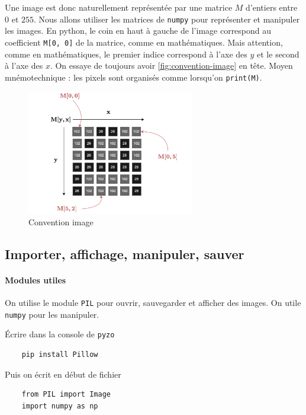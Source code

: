 Une image est donc naturellement représentée par une matrice $ M $ d'entiers entre $ 0 $ et $ 255 $. Nous allons utiliser les matrices de \texttt{numpy} pour représenter et manipuler les images. En python, le coin en haut à gauche de l'image correspond au coefficient \texttt{M[0, 0]} de la matrice, comme en mathématiques. Mais attention, comme en mathématiques, le premier indice correspond à l'axe des $ y $ et le second à l'axe des $ x $. On essaye de toujours avoir \autoref{fig:convention-image} en tête. Moyen mnémotechnique : les pixels sont organisés comme lorsqu'on \texttt{print(M)}.

\begin{figure}[h!]
    \begin{center}
        \includegraphics[width=0.65\textwidth]{figures/image_grise.png}
    \end{center}
    \caption{ Convention image}
    \label{fig:convention-image}
\end{figure}

\subsection{Importer, affichage, manipuler, sauver}

\paragraph*{Modules utiles} On utilise le module \texttt{PIL} pour ouvrir, sauvegarder et afficher des images. On utile \texttt{numpy} pour les manipuler.

Écrire dans la console de \texttt{pyzo}
\begin{verbatim}
    pip install Pillow
\end{verbatim}

Puis on écrit en début de fichier 
\begin{verbatim}
    from PIL import Image
    import numpy as np
\end{verbatim}

